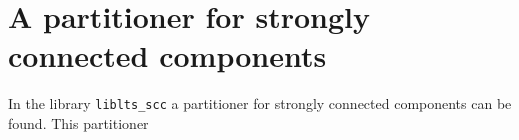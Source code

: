 \documentclass{article}
\begin{document}
\section{A partitioner for strongly connected components}
In the library {\tt liblts_scc} a partitioner for strongly connected
components can be found. This partitioner 
\end{document}
